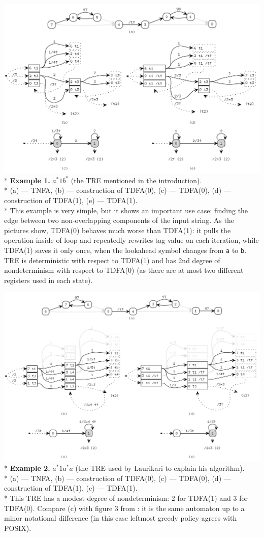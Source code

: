 \documentclass{article}
\newenvironment{Xfig}
    {\par\medskip\noindent\minipage{\linewidth}\begin{center}}
    {\end{center}\endminipage\par\medskip}
\theoremstyle{definition}
\begin{document}
\begin{Xfig}
\includegraphics[width=0.9\linewidth]{img/example1/all.png}\\*
\textbf{Example 1.} $a^* 1 b^*$ (the TRE mentioned in the introduction).\\*
(a) --- TNFA, (b) --- construction of TDFA(0), (c) --- TDFA(0), (d) --- construction of TDFA(1), (e) --- TDFA(1).
\\*\medskip
This example is very simple, but it shows an important use case:
finding the edge between two non-overlapping components of the input string.
As the pictures show, TDFA(0) behaves much worse than TDFA(1):
it pulls the operation inside of loop and repeatedly rewrites tag value on each iteration,
while TDFA(1) saves it only once, when the lookahead symbol changes from \texttt{a} to \texttt{b}.
TRE is deterministic with respect to TDFA(1)
and has 2nd degree of nondeterminism with respect to TDFA(0)
(as there are at most two different registers used in each state).
\end{Xfig}

\begin{Xfig}
\includegraphics[width=0.9\linewidth]{img/example2/all.png}\\*
\textbf{Example 2.} $a^* 1 a^* a$ (the TRE used by Laurikari to explain his algorithm).\\*
(a) --- TNFA, (b) --- construction of TDFA(0), (c) --- TDFA(0), (d) --- construction of TDFA(1), (e) --- TDFA(1).\\*
This TRE has a modest degree of nondeterminism: 2 for TDFA(1) and 3 for TDFA(0).
Compare (c) with figure 3 from \cite{Lau00}: it is the same automaton up to a minor notational difference
(in this case leftmost greedy policy agrees with POSIX).
\end{Xfig}
\end{document}
